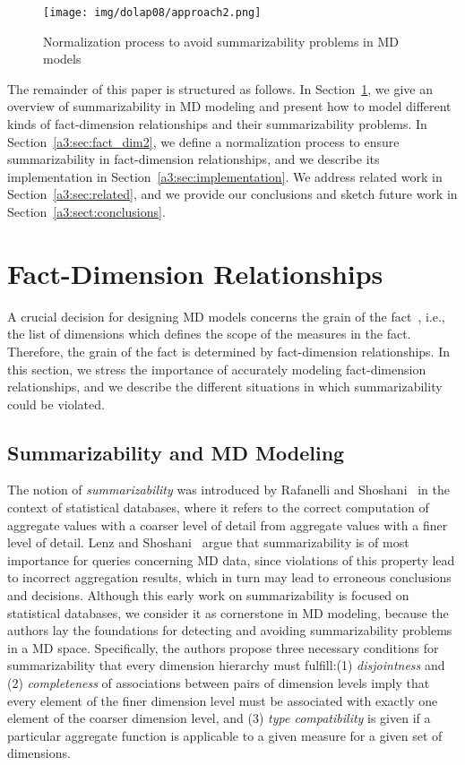 \begin{figure}
\begin{center}
\texttt{[image: img/dolap08/approach2.png]}
\end{center}
\caption{Normalization process to avoid summarizability problems in
MD models} \label{a3:fig:approach}
\end{figure}

The remainder of this paper is structured as follows.  In
Section~\ref{a3:sec:fact_dim1}, we give an overview of
summarizability in MD modeling and present how to model different
kinds of fact-dimension relationships and their summarizability
problems. In Section~\ref{a3:sec:fact_dim2}, we define a
normalization process to ensure summarizability in fact-dimension
relationships, and we describe its implementation in
Section~\ref{a3:sec:implementation}.  We address related work in
Section~\ref{a3:sec:related}, and we provide our conclusions and
sketch future work in Section~\ref{a3:sect:conclusions}.

\section{Fact-Dimension Relationships}\label{a3:sec:fact_dim1}
A crucial decision for designing MD models concerns the grain of the
fact~\cite{book/Kimball/DW}, i.e., the list of dimensions which
defines the scope of the measures in the fact. Therefore, the grain
of the fact is determined by fact-dimension relationships. In this
section, we stress the importance of accurately modeling
fact-dimension relationships, and we describe the different
situations in which summarizability could be violated.

\subsection{Summarizability and MD Modeling}
The notion of \emph{summarizability} was introduced by Rafanelli and
Shoshani~\cite{DBLP:conf/ssdbm/RafanelliS90} in the context of
statistical databases, where it refers to the correct computation of
aggregate values with a coarser level of detail from aggregate
values with a finer level of detail. Lenz and
Shoshani~\cite{DBLP:conf/ssdbm/LenzS97} argue that summarizability
is of most importance for queries concerning MD data, since
violations of this property lead to incorrect aggregation results,
which in turn may lead to erroneous conclusions and decisions.
Although this early work on summarizability is focused on
statistical databases, we consider it as cornerstone in MD modeling,
because the authors lay the foundations for detecting and avoiding
summarizability problems in a MD space.  Specifically, the authors
propose three necessary conditions for summarizability that every
dimension hierarchy must fulfill:(1) \emph{disjointness} and (2)
\emph{completeness} of associations between pairs of dimension
levels imply that every element of the finer dimension level must be
associated with exactly one element of the coarser dimension level,
and (3) \emph{type
  compatibility} is given if a particular aggregate function is applicable to
a given measure for a given set of dimensions.

